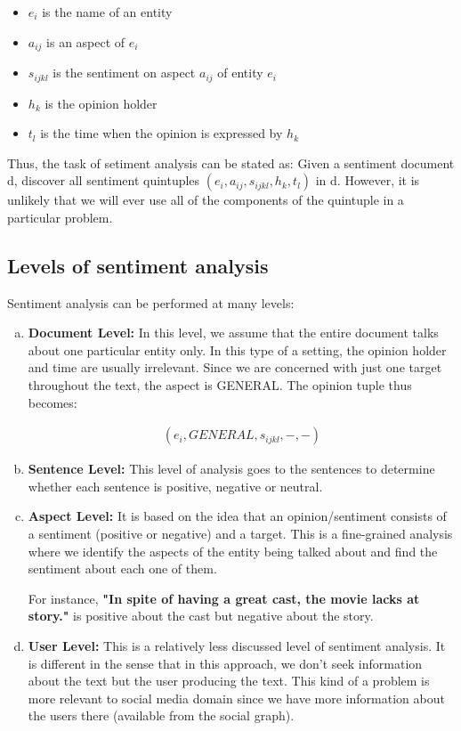 \begin{itemize}
 \item $e_i$ is the name of an entity
 \item $a_{ij}$ is an aspect of $e_i$
 \item $s_{ijkl}$ is the sentiment on aspect $a_{ij}$ of entity $e_i$
 \item $h_k$ is the opinion holder
 \item $t_l$ is the time when the opinion is expressed by $h_k$
\end{itemize}

Thus, the task of setiment analysis can be stated as:
Given a sentiment document d, discover all sentiment quintuples $( e_i , a_{ij} , s_{ijkl} , h_k , t_l )$ in d. However, it is unlikely that we 
will ever use all of the components of the quintuple in a particular problem.

\subsection{Levels of sentiment analysis}

Sentiment analysis can be performed at many levels: 

\begin{enumerate}[(a)]%
\setlength{\itemsep}{15pt}
\item \textbf{Document Level: } In this level, we assume that the entire document talks about one particular entity only. 
In this type of a setting, the opinion holder and time are usually irrelevant. Since we are concerned with just one target throughout the text, the aspect is GENERAL.
The opinion tuple thus becomes: 

\begin{framed}
\begin{eqnarray}
 ( e_i , GENERAL , s_{ijkl} , - , - ) \nonumber
\end{eqnarray}
\end{framed}

\item \textbf{Sentence Level: } This level of analysis goes to the sentences to determine whether each sentence is positive, negative or neutral.
\item \textbf{Aspect Level: } It is based on the idea that an opinion/sentiment consists of a sentiment (positive or negative) and a target. This is a fine-grained 
analysis where we identify the aspects of the entity being talked about and find the sentiment about each one of them. 

For instance, 
\textbf{"In spite of having a great cast, the movie lacks at story."} is positive about the cast but negative about the story. 

\item \textbf{User Level: } This is a relatively less discussed level of sentiment analysis. It is different in the sense that in this approach, we don't seek information
about the text but the user producing the text. This kind of a problem is more relevant to social media domain since we have more information about the users there (available
from the social graph).
\end{enumerate} 

